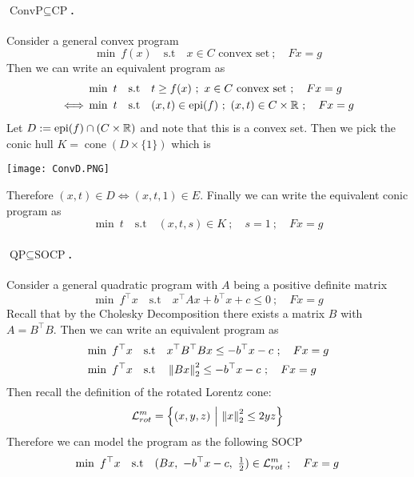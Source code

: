 \documentclass[answers]{exam}
\begin{document}
    \paragraph{$\text{ConvP}\subseteq \text{CP}$.} Consider a general convex program 
    $$ \min\  f(x) \quad \text{s.t}\quad x\in C\text{ convex set}\ ;\quad Fx = g $$
    Then we can write an equivalent program as 
    \begin{align*}
        & \min\  t\quad \text{s.t}\quad t \geq f(x)\ ;\  x\in C\text{ convex set}\ ;\quad Fx = g \\
        \iff & \min\  t\quad \text{s.t}\quad (x,t)\in \operatorname*{epi}(f)\ ;\  (x,t)\in C\times \mathbb{R} \ ;\quad Fx = g
    \end{align*}
    Let $D:= \operatorname*{epi}(f) \cap (C\times \mathbb{R})$ and note that this is a convex set. Then we pick the conic hull $K = \operatorname*{cone}(D\times \{1\})$ which is 
    \begin{center}
        \texttt{[image: ConvD.PNG]}
    \end{center}
    Therefore $(x,t)\in D \iff (x,t,1)\in E$. Finally we can write the equivalent conic program as 
    $$ \min\  t \quad \text{s.t}\quad (x,t,s)\in K\ ;\quad s=1\ ;\quad Fx = g $$
    \paragraph{$\text{QP}\subseteq \text{SOCP}$.} Consider a general quadratic program with $A$ being a positive definite matrix
    $$ \min\  f^\top x \quad \text{s.t}\quad x^\top Ax + b^\top x + c\leq 0\ ;\quad Fx = g $$
    Recall that by the Cholesky Decomposition there exists a matrix $B$ with $A = B^\top B$. Then we can write an equivalent program as 
    \begin{align*}
        & \min\  f^\top x\quad \text{s.t}\quad x^\top B^\top B x \leq -b^\top x - c\ ;\quad Fx = g \\ 
        & \min\  f^\top x\quad \text{s.t}\quad \left\lVert B x \right\rVert_2^2 \leq -b^\top x - c\ ;\quad Fx = g
    \end{align*}
    Then recall the definition of the rotated Lorentz cone: 
    $$ \mathcal{L}_{rot}^{m} = \left\{(x,y,z) \ \middle|\ \left\lVert x \right\rVert_2^2 \leq 2yz\right\} $$
    Therefore we can model the program as the following SOCP 
    $$ \min\  f^\top x \quad \text{s.t}\quad (Bx,\ -b^\top x - c,\ \tfrac{1}{2}) \in \mathcal{L}_{rot}^m \ ;\quad Fx = g $$
\end{document}
